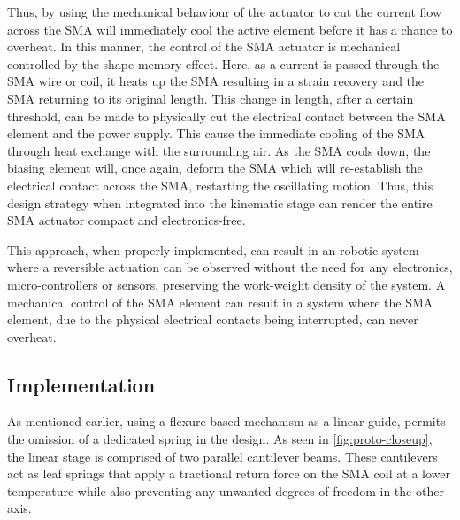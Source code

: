 Thus, by using the mechanical behaviour of the actuator to cut the current flow across the SMA will immediately cool the active element before it has a chance to overheat. In this manner, the control of the SMA actuator is mechanical controlled by the shape memory effect. Here, as a current is passed through the SMA wire or coil, it heats up the SMA resulting in a strain recovery and the SMA returning to its original length. This change in length, after a certain threshold, can be made to physically cut the electrical contact between the SMA element and the power supply. This cause the immediate cooling of the SMA through heat exchange with the surrounding air. As the SMA cools down, the biasing element will, once again, deform the SMA which will re-establish the electrical contact across the SMA, restarting the oscillating motion. Thus, this design strategy when integrated into the kinematic stage can render the entire SMA actuator compact and electronics-free.

This approach, when properly implemented, can result in an robotic system where a reversible actuation can be observed without the need for any electronics, micro-controllers or sensors, preserving the work-weight density of the system. A mechanical control of the SMA element can result in a system where the SMA element, due to the physical electrical contacts being interrupted, can never overheat.

\subsection{Implementation}
As mentioned earlier, using a flexure based mechanism as a linear guide, permits the omission of a dedicated spring in the design. As seen in \cref{fig:proto-closeup}, the linear stage is comprised of two parallel cantilever beams. These cantilevers act as leaf springs that apply a tractional return force on the SMA coil at a lower temperature while also preventing any unwanted degrees of freedom in the other axis.

